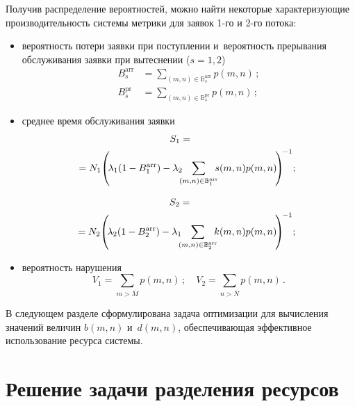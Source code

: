 \begin{multicols}{2}
  Получив распределение вероятностей, можно найти некоторые 
характеризующие производительность системы метрики для заявок 1-го и 
2-го потока:
  \begin{itemize}
  \item вероятность потери заявки при поступлении и~вероятность 
прерывания обслуживания заявки при вытеснении ($s=1, 2$)
  \begin{align*}
  B_s^{\mathrm{arr}}&=\sum\limits_{(m,n)\in \mathbb{B}_s^{\mathrm{arr}}} p(m,n)\,;\\
  B_s^{\mathrm{pr}}&=\sum\limits_{(m,n)\in \mathbb{B}_s^{\mathrm{pr}}} p(m,n)\,;
  \end{align*}
\item среднее время обслуживания заявки
\begin{multline*}
\hspace*{-15pt}S_1={}\\
\hspace*{-15pt}{}={N_1} \!\left(\!\lambda_1(1-B_1^{\mathrm{arr}})- %
\lambda_2\!\!\! \sum\limits_{(m,n)\in \mathbb{B}_1^{\mathrm{arr}}}\!\!\! 
s(m,n)p(m,n)\!\right)^{\!-1}\!;\hspace*{-9pt}
\end{multline*}

\vspace*{-12pt}

\noindent
\begin{multline*}
\hspace*{-15pt}S_2={}\\
\hspace*{-15pt}{}={N_2} \!\left(\!\lambda_2(1-B_2^{\mathrm{arr}})- %
\lambda_1 \!\!\!\sum\limits_{(m,n)\in 
\mathbb{B}_2^{\mathrm{arr}}} \!\!\!k(m,n)p(m,n)\!\right)^{\!-1}\!;\hspace*{-9pt}
\end{multline*}
\item вероятность нарушения
$$
V_1=\sum\limits_{m>\overline{M}} p(m,n)\,;\quad 
V_2=\sum\limits_{n>\overline{N}} p(m,n)\,.
$$
  \end{itemize}
  
  В следующем разделе сформулирована задача оптимизации для 
вычисления значений  
величин $b(m,n)$ и~$d(m,n)$, обеспечивающая эффективное использование 
ресурса системы.
  
  \section{Решение задачи разделения ресурсов} %
  

\end{multicols}
